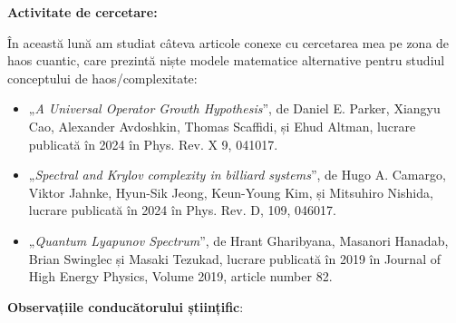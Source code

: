 
\makereportpreamble

\textbf{Activitate de cercetare:}

În această lună am studiat câteva articole conexe cu cercetarea mea pe zona de haos cuantic, care prezintă niște modele matematice alternative pentru studiul conceptului de haos/complexitate:

\begin{itemize}
    \item „\emph{A Universal Operator Growth Hypothesis}”, de Daniel E. Parker, Xiangyu Cao, Alexander Avdoshkin, Thomas Scaffidi, și Ehud Altman, lucrare publicată în 2024 în Phys. Rev. X 9, 041017.

    \item „\emph{Spectral and Krylov complexity in billiard systems}”, de Hugo A. Camargo, Viktor Jahnke, Hyun-Sik Jeong, Keun-Young Kim, și Mitsuhiro Nishida, lucrare publicată în 2024 în Phys. Rev. D, 109, 046017.

    \item „\emph{Quantum Lyapunov Spectrum}”, de Hrant Gharibyana, Masanori Hanadab, Brian Swinglec și Masaki Tezukad, lucrare publicată în 2019 în Journal of High Energy Physics, Volume 2019, article number 82.
\end{itemize}

\vspace{0.5em}

\textbf{Observațiile conducătorului științific}:

\vspace{3em}

